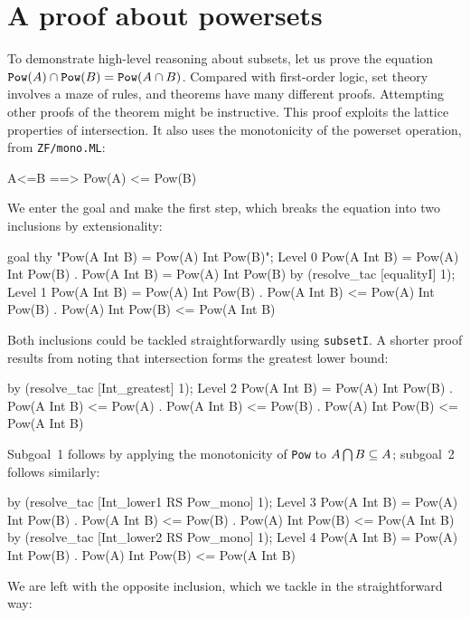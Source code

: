 \section{A proof about powersets}\label{sec:ZF-pow-example}
To demonstrate high-level reasoning about subsets, let us prove the
equation ${{\tt Pow}(A)\cap {\tt Pow}(B)}= {\tt Pow}(A\cap B)$.  Compared
with first-order logic, set theory involves a maze of rules, and theorems
have many different proofs.  Attempting other proofs of the theorem might
be instructive.  This proof exploits the lattice properties of
intersection.  It also uses the monotonicity of the powerset operation,
from {\tt ZF/mono.ML}:
\begin{ttbox}
      A<=B ==> Pow(A) <= Pow(B)
\end{ttbox}
We enter the goal and make the first step, which breaks the equation into
two inclusions by extensionality:
\begin{ttbox}
goal thy "Pow(A Int B) = Pow(A) Int Pow(B)";
{\out Level 0}
{\out Pow(A Int B) = Pow(A) Int Pow(B)}
{. Pow(A Int B) = Pow(A) Int Pow(B)}
\ttbreak
by (resolve_tac [equalityI] 1);
{\out Level 1}
{\out Pow(A Int B) = Pow(A) Int Pow(B)}
{. Pow(A Int B) <= Pow(A) Int Pow(B)}
{. Pow(A) Int Pow(B) <= Pow(A Int B)}
\end{ttbox}
Both inclusions could be tackled straightforwardly using {\tt subsetI}.
A shorter proof results from noting that intersection forms the greatest
lower bound:
\begin{ttbox}
by (resolve_tac [Int_greatest] 1);
{\out Level 2}
{\out Pow(A Int B) = Pow(A) Int Pow(B)}
{. Pow(A Int B) <= Pow(A)}
{. Pow(A Int B) <= Pow(B)}
{. Pow(A) Int Pow(B) <= Pow(A Int B)}
\end{ttbox}
Subgoal~1 follows by applying the monotonicity of {\tt Pow} to $A\bigcap
B\subseteq A$; subgoal~2 follows similarly:
\begin{ttbox}
by (resolve_tac [Int_lower1 RS Pow_mono] 1);
{\out Level 3}
{\out Pow(A Int B) = Pow(A) Int Pow(B)}
{. Pow(A Int B) <= Pow(B)}
{. Pow(A) Int Pow(B) <= Pow(A Int B)}
\ttbreak
by (resolve_tac [Int_lower2 RS Pow_mono] 1);
{\out Level 4}
{\out Pow(A Int B) = Pow(A) Int Pow(B)}
{. Pow(A) Int Pow(B) <= Pow(A Int B)}
\end{ttbox}
We are left with the opposite inclusion, which we tackle in the
straightforward way:
